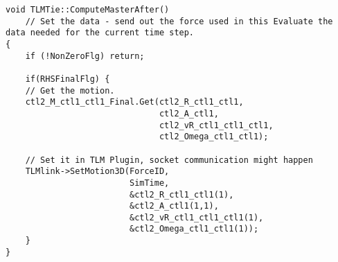 {\scriptsize
\begin{verbatim}
void TLMTie::ComputeMasterAfter()
    // Set the data - send out the force used in this Evaluate the data needed for the current time step.
{
    if (!NonZeroFlg) return;

    if(RHSFinalFlg) {
	// Get the motion.
    ctl2_M_ctl1_ctl1_Final.Get(ctl2_R_ctl1_ctl1,
                               ctl2_A_ctl1,
                               ctl2_vR_ctl1_ctl1_ctl1,
                               ctl2_Omega_ctl1_ctl1);

	// Set it in TLM Plugin, socket communication might happen
    TLMlink->SetMotion3D(ForceID,
                         SimTime,
                         &ctl2_R_ctl1_ctl1(1),
                         &ctl2_A_ctl1(1,1),
                         &ctl2_vR_ctl1_ctl1_ctl1(1),
                         &ctl2_Omega_ctl1_ctl1(1));
    }
}
\end{verbatim}
}


